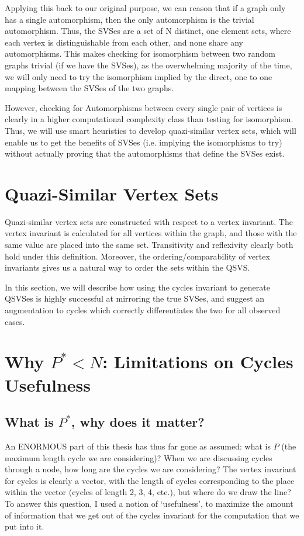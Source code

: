 Applying this back to our original purpose, we can reason that if a graph only has a single automorphism, then the only automorphism is the trivial automorphism.
Thus, the SVSes are a set of N distinct, one element sets, where each vertex is distinguishable from each other, and none share any automorphisms.
This makes checking for isomorphism between two random graphs trivial (if we have the SVSes), as the overwhelming majority of the time, we will only need to try the isomorphism implied by the direct, one to one mapping between the SVSes of the two graphs.

However, checking for Automorphisms between every single pair of vertices is clearly in a higher computational complexity class than testing for isomorphism.
Thus, we will use smart heuristics to develop quazi-similar vertex sets, which will enable us to get the benefits of SVSes (i.e. implying the isomorphisms to try) without actually proving that the automorphisms that define the SVSes exist.

\section{Quazi-Similar Vertex Sets}

Quazi-similar vertex sets are constructed with respect to a vertex invariant.
The vertex invariant is calculated for all vertices within the graph, and those with the same value are placed into the same set.
Transitivity and reflexivity clearly both hold under this definition.
Moreover, the ordering/comparability of vertex invariants gives us a natural way to order the sets within the QSVS.

In this section, we will describe how using the cycles invariant to generate QSVSes is highly successful at mirroring the true SVSes, and suggest an augmentation to cycles which correctly differentiates the two for all observed cases.



\section{Why $P^*<N$: Limitations on Cycles Usefulness}

\subsection{What is $P^*$, why does it matter?}

An ENORMOUS part of this thesis has thus far gone as assumed: what is $P$ (the maximum length cycle we are considering)?
When we are discussing cycles through a node, how long are the cycles we are considering?
The vertex invariant for cycles is clearly a vector, with the length of cycles corresponding to the place within the vector (cycles of length 2, 3, 4, etc.), but where do we draw the line?
To answer this question, I used a notion of `usefulness', to maximize the amount of information that we get out of the cycles invariant for the computation that we put into it.

